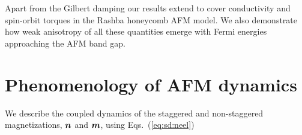 Apart from the Gilbert damping our results extend to cover conductivity and spin-orbit torques in the Rashba honeycomb AFM model. We also demonstrate how weak anisotropy of all these quantities emerge with Fermi energies approaching the AFM band gap. 

\section{Phenomenology of AFM dynamics}
We describe the coupled dynamics of the staggered and non-staggered magnetizations, $\boldsymbol{n}$ and $\boldsymbol{m}$, using Eqs.~(\ref{eq:sd:neel}) 



